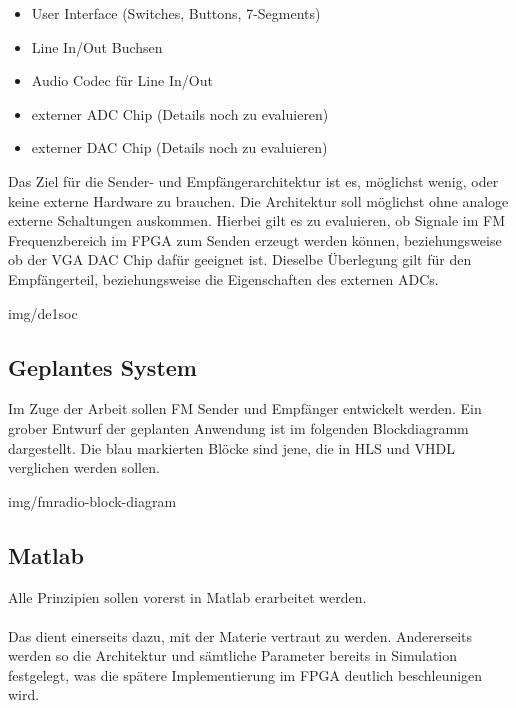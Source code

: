 \begin{itemize}
  \item User Interface (Switches, Buttons, 7-Segments)
  \item Line In/Out Buchsen
  \item Audio Codec für Line In/Out
  \item externer ADC Chip (Details noch zu evaluieren)
  \item externer DAC Chip (Details noch zu evaluieren)
\end{itemize}

Das Ziel für die Sender- und Empfängerarchitektur ist es, möglichst wenig, oder keine externe Hardware zu brauchen. Die Architektur soll möglichst ohne analoge externe Schaltungen auskommen. Hierbei gilt es zu evaluieren, ob Signale im FM Frequenzbereich im FPGA zum Senden erzeugt werden können, beziehungsweise ob der VGA DAC Chip dafür geeignet ist. Dieselbe Überlegung gilt für den Empfängerteil, beziehungsweise die Eigenschaften des externen ADCs.

 {img/de1soc}

\subsection{Geplantes System}

Im Zuge der Arbeit sollen FM Sender und Empfänger entwickelt werden.
Ein grober Entwurf der geplanten Anwendung ist im folgenden Blockdiagramm dargestellt. Die blau markierten Blöcke sind jene, die in HLS und VHDL verglichen werden sollen.

 {img/fmradio-block-diagram}

\subsection{Matlab}

Alle Prinzipien sollen vorerst in Matlab erarbeitet werden.\\
\\
Das dient einerseits dazu, mit der Materie vertraut zu werden. Andererseits werden so die Architektur und sämtliche Parameter bereits in Simulation festgelegt, was die spätere Implementierung im FPGA deutlich beschleunigen wird.

